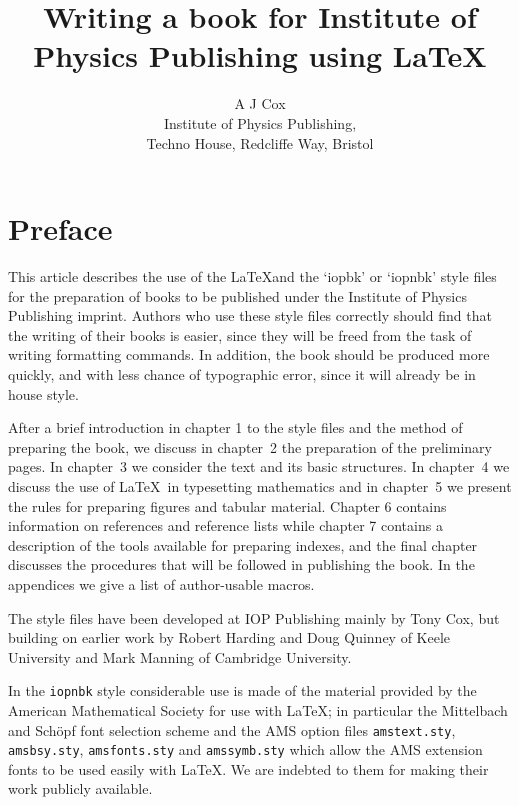 \title{Writing a book for Institute of Physics Publishing using 
\ifnbk\LaTeX\else\bigLaTeX\fi}
\author{A J Cox\\[2pc]
Institute of Physics Publishing,\\
Techno House, Redcliffe Way, Bristol}
\makeindex
\newtheorem{example}{Example}

\maketitle
{}
\setcounter{page}{5}
\tableofcontents

\chapter*{Preface}
This article describes the use of the \LaTeX and the `iopbk' or
`iopnbk' style files 
for the preparation of books to be 
published under the Institute of Physics Publishing imprint. 
Authors who use these style files
correctly should find that the writing of their books is
easier, since they will be freed from the task of writing formatting 
commands. In addition, the book should be produced more quickly, and 
with less chance of typographic error, since it will already be
in house style. 

After a brief introduction in chapter 1 to 
the style files and the method of 
preparing the book, we discuss in chapter~2 the 
preparation of the preliminary pages. In chapter~3 we consider the 
text and its basic structures.
In chapter~4 we discuss the use of \LaTeX\ in typesetting mathematics 
and in 
chapter~5 we present the rules for preparing figures and tabular 
material. Chapter 6 contains information on references and reference 
lists while chapter 7 contains a description of the tools available 
for preparing 
indexes, 
and the final chapter discusses the procedures that will be 
followed in publishing the book. In the appendices we give a list of 
author-usable macros.

The style files have been developed at IOP Publishing mainly by Tony 
Cox, but building on earlier work by Robert Harding and Doug Quinney of
Keele University and
Mark Manning of Cambridge University. 

In the \verb"iopnbk" style
considerable use is made of the 
material provided by the American Mathematical Society for use with 
\LaTeX; in particular the Mittelbach and Sch\"opf font selection scheme
and the AMS option files \verb"amstext.sty", \verb"amsbsy.sty", 
\verb"amsfonts.sty" and \verb"amssymb.sty" which allow the AMS extension
fonts to be used easily with \LaTeX. We are indebted to them for making
their work publicly available.

